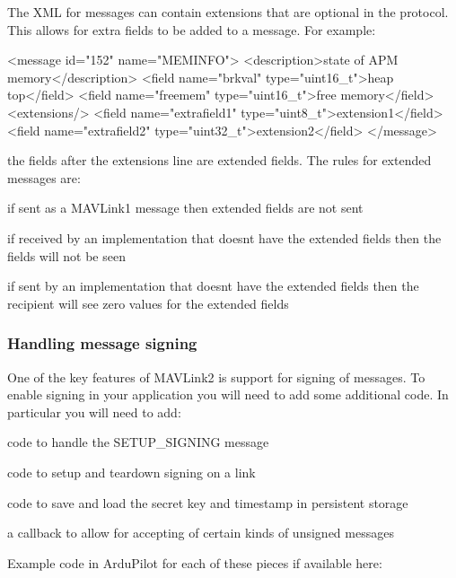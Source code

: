 The X\+ML for messages can contain extensions that are optional in the protocol. This allows for extra fields to be added to a message. For example\+:


\begin{DoxyCode}
<message id="152" name="MEMINFO">
  <description>state of APM memory</description>
  <field name="brkval" type="uint16\_t">heap top</field>
  <field name="freemem" type="uint16\_t">free memory</field>
  <extensions/>
  <field name="extrafield1" type="uint8\_t">extension1</field>
  <field name="extrafield2" type="uint32\_t">extension2</field>
</message>
\end{DoxyCode}


the fields after the extensions line are extended fields. The rules for extended messages are\+:


\begin{DoxyItemize}
\item if sent as a M\+A\+V\+Link1 message then extended fields are not sent
\item if received by an implementation that doesn\textquotesingle{}t have the extended fields then the fields will not be seen
\item if sent by an implementation that doesn\textquotesingle{}t have the extended fields then the recipient will see zero values for the extended fields
\end{DoxyItemize}

\subsubsection*{Handling message signing}

One of the key features of M\+A\+V\+Link2 is support for signing of messages. To enable signing in your application you will need to add some additional code. In particular you will need to add\+:


\begin{DoxyItemize}
\item code to handle the S\+E\+T\+U\+P\+\_\+\+S\+I\+G\+N\+I\+NG message
\item code to setup and teardown signing on a link
\item code to save and load the secret key and timestamp in persistent storage
\item a callback to allow for accepting of certain kinds of unsigned messages
\end{DoxyItemize}

Example code in Ardu\+Pilot for each of these pieces if available here\+:

